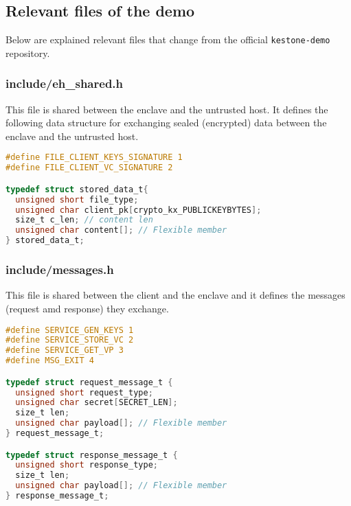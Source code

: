 \subsection*{Relevant files of the demo}
Below are explained relevant files that change from the official \texttt{kestone-demo} repository.

\subsubsection{include/eh\_shared.h}
This file is shared between the enclave and the untrusted host. It defines the following data structure for exchanging sealed (encrypted) data between the enclave and the untrusted host. 

\begin{lstlisting}[language=C,frame=single]
#define FILE_CLIENT_KEYS_SIGNATURE 1
#define FILE_CLIENT_VC_SIGNATURE 2

typedef struct stored_data_t{
  unsigned short file_type;
  unsigned char client_pk[crypto_kx_PUBLICKEYBYTES];
  size_t c_len; // content len 
  unsigned char content[]; // Flexible member
} stored_data_t;    
\end{lstlisting}

\subsubsection{include/messages.h}
This file is shared between the client and the enclave and it defines the messages (request amd response) they exchange. 
\begin{lstlisting}[language=C,frame=single]
#define SERVICE_GEN_KEYS 1
#define SERVICE_STORE_VC 2
#define SERVICE_GET_VP 3
#define MSG_EXIT 4

typedef struct request_message_t {
  unsigned short request_type;
  unsigned char secret[SECRET_LEN];
  size_t len;
  unsigned char payload[]; // Flexible member
} request_message_t;

typedef struct response_message_t {
  unsigned short response_type;
  size_t len;
  unsigned char payload[]; // Flexible member
} response_message_t;
\end{lstlisting}

